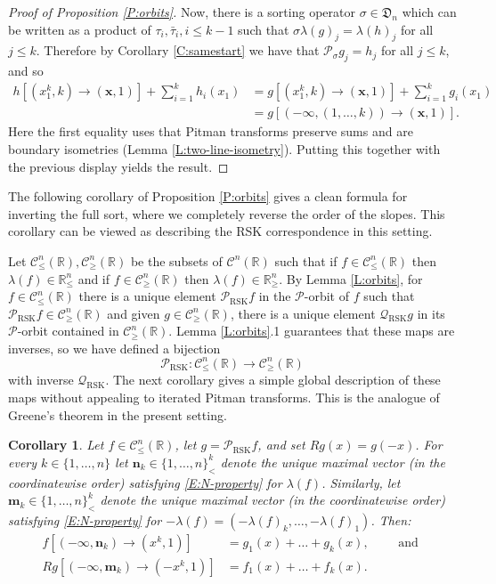 \documentclass[11pt]{article}
\newcommand{\R}{\mathbb{R}}
\newcommand{\sig}{\sigma}
\newcommand{\la}{\lambda}
\newcommand{\cC}{\mathcal{C}}
\newcommand{\cP}{\mathcal{P}}
\newcommand{\cQ}{\mathcal{Q}}
\newcommand{\bx}{\mathbf{x}}
\newcommand{\bn}{\mathbf{n}}
\newcommand{\bm}{\mathbf{m}}
\newtheorem{corollary}[theorem]{Corollary}
\theoremstyle{definition} %
\theoremstyle{remark} %
\begin{document}
\begin{proof}[Proof of Proposition \ref{P:orbits}]
Now, there is a sorting operator $\sig \in \mathfrak{D}_n$ which can be written as a product of $\tau_i, \bar \tau_i, i \le k-1$ such that $\sig \la(g)_j = \la(h)_j$ for all $j \le k$. Therefore by Corollary \ref{C:samestart} we have that $\cP_\sig g_j = h_j$ for all $j \le k$, and so
\begin{align*}
h[(x_1^k, k)\to (\bx, 1)] + \sum_{i=1}^k h_i(x_1)
&= g[(x_1^k, k)\to (\bx, 1)] + \sum_{i=1}^k g_i(x_1) \\
 &= g[(-\infty, (1, \dots, k)) \to (\bx, 1)].
\end{align*}
Here the first equality uses that Pitman transforms preserve sums and are boundary isometries (Lemma \ref{L:two-line-isometry}). Putting this together with the previous display yields the result.
\end{proof}

The following corollary of Proposition \ref{P:orbits} gives a clean formula for inverting the full sort, where we completely reverse the order of the slopes. This corollary can be viewed as describing the RSK correspondence in this setting. 

Let $\cC^n_\le(\R), \cC^n_\ge(\R)$ be the subsets of $\cC^n(\R)$ such that if $f \in \cC^n_\le(\R)$ then $\la(f) \in \R^n_\le$ and if $f \in \cC^n_\ge(\R)$ then $\la(f) \in \R^n_\ge$. By Lemma \ref{L:orbits}, for $f \in \cC^n_\le(\R)$ there is a unique element $\cP_{\operatorname{RSK}} f$ in the $\cP$-orbit of $f$ such that $\cP_{\operatorname{RSK}} f \in \cC^n_\ge(\R)$ and given $g \in \cC^n_\ge(\R)$, there is a unique element $\cQ_{\operatorname{RSK}} g$ in its $\cP$-orbit contained in $\cC^n_\ge(\R)$. Lemma \ref{L:orbits}.1 guarantees that these maps are inverses, so we have defined a bijection
$$
\cP_{\operatorname{RSK}}: \cC^n_\le(\R) \to \cC^n_\ge(\R)
$$
with inverse $\cQ_{\operatorname{RSK}}$. The next corollary gives a simple global description of these maps without appealing to iterated Pitman transforms. This is the analogue of Greene's theorem in the present setting.


\begin{corollary}
\label{C:RSK}
Let $f \in \cC^n_\le(\R)$, let $g = \cP_{\operatorname{RSK}} f$, and set $Rg(x) = g(-x)$. For every $k \in \{1, \dots, n\}$ let $\bn_k  \in \{1, \dots, n\}^k_<$ denote the unique maximal vector (in the coordinatewise order) satisfying \eqref{E:N-property} for $\la(f)$. Similarly, let  $\bm_k \in \{1, \dots, n\}^k_<$ denote the unique maximal vector (in the coordinatewise order) satisfying \eqref{E:N-property} for $- \la(f) = (-\la(f)_k, \dots, -\la(f)_1)$. Then:
\begin{align*}
f[(-\infty, \bn_k) \to (x^k, 1)] &= g_1(x) + \dots + g_k(x), \qquad \text{ and } \\
Rg[(-\infty, \bm_k) \to (-x^k, 1)] &= f_1(x) + \dots + f_k(x).
\end{align*}
\end{corollary}
\end{document}
